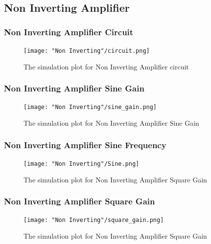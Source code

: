 \documentclass{article}
\begin{document}
	
	
	
	\subsection{Non Inverting Amplifier}
	\subsubsection{Non Inverting Amplifier Circuit}
	\begin{figure}[H]
	
	\centering
	\texttt{[image: "Non Inverting"/circuit.png]}
	\caption{The simulation plot for Non Inverting Amplifier circuit}
	\label{fig:non_inv_circuit}
	\end{figure}
	\subsubsection{Non Inverting Amplifier Sine Gain}
	\begin{figure}[H]
	
	\centering
	\texttt{[image: "Non Inverting"/sine\_gain.png]}
	\caption{The simulation plot for Non Inverting Amplifier Sine Gain}
	\label{fig:noninv_sine_gain}
	\end{figure}
	\subsubsection{Non Inverting Amplifier Sine Frequency}
	\begin{figure}[H]
	
	\centering
	\texttt{[image: "Non Inverting"/Sine.png]}
	\caption{The simulation plot for Non Inverting Amplifier Square Gain}
	\label{fig:noninv_SineFreq}
	\end{figure}
	
	\subsubsection{Non Inverting Amplifier Square Gain}
	\begin{figure}[H]
	
	\centering
	\texttt{[image: "Non Inverting"/square\_gain.png]}
	\caption{The simulation plot for Non Inverting Amplifier Square Gain}
	\label{fig:noninv_square_gain}
	\end{figure}
	
\end{document}
